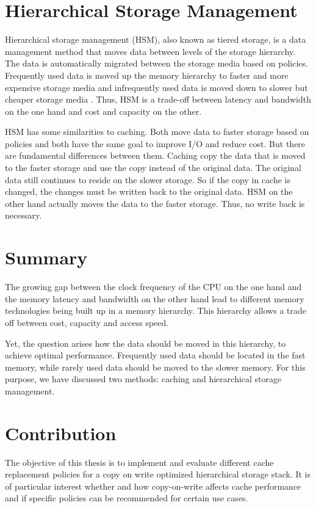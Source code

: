 \documentclass[
	12pt,
	a4paper,
	abstract,
	bibliography=totoc,
	chapterprefix,
	headings=openright,
	numbers=endperiod,
	parskip=half,
	twoside,
]{scrreprt}
\begin{document}
\section{Hierarchical Storage Management}

Hierarchical storage management (HSM), also known as tiered storage, 
is a data management method that moves data between levels of the storage hierarchy.
The data is automatically migrated between the storage media based on policies.
Frequently used data is moved up the memory hierarchy to faster and more expensive 
storage media and infrequently used data is moved down to slower but cheaper storage media 
\cite{lugar2001hierarchical}.
Thus, HSM is a trade-off between latency and bandwidth on the one hand 
and cost and capacity on the other.

HSM has some similarities to caching.
Both move data to faster storage based on policies and both have the same goal to improve I/O 
and reduce cost.
But there are fundamental differences between them.
Caching copy the data that is moved to the faster storage and use the copy instead of the original data. 
The original data still continues to reside on the slower storage.
So if the copy in cache is changed, the changes must be written back to the original data.
HSM on the other hand actually moves the data to the faster storage.
Thus, no write back is necessary.

\section{Summary}

The growing gap between the clock frequency of the CPU on the one hand and 
the memory latency and bandwidth on the other hand lead to different memory technologies 
being built up in a memory hierarchy.
This hierarchy allows a trade off between cost, capacity and access speed.

Yet, the question arises how the data should be moved in this hierarchy, to achieve optimal performance.
Frequently used data should be located in the fast memory, while rarely used data should be moved to the slower memory.
For this purpose, we have discussed two methods: caching and hierarchical storage management.

\section{Contribution}

The objective of this thesis is to implement and evaluate different cache replacement policies 
for a copy on write optimized hierarchical storage stack.
It is of particular interest whether and how copy-on-write affects cache performance and 
if specific policies can be recommended for certain use cases.
\end{document}
